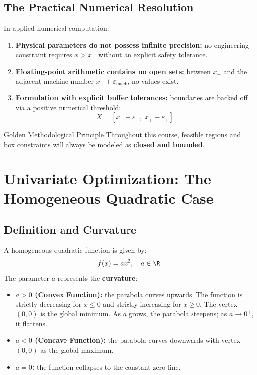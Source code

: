 \subsection{The Practical Numerical Resolution}
In applied numerical computation:
\begin{enumerate}
    \item \textbf{Physical parameters do not possess infinite precision:} no engineering constraint requires $x > x_-$ without an explicit safety tolerance.
    \item \textbf{Floating-point arithmetic contains no open sets:} between $x_-$ and the adjacent machine number $x_- + \varepsilon_{\text{mach}}$, no values exist.
    \item \textbf{Formulation with explicit buffer tolerances:} boundaries are backed off via a positive numerical threshold:
    \begin{equation}
    X = [x_- + \varepsilon_-, \; x_+ - \varepsilon_+]
    \end{equation}
\end{enumerate}

\begin{noteblock}{Golden Methodological Principle}
Throughout this course, feasible regions and box constraints will always be modeled as \textbf{closed and bounded}.
\end{noteblock}


\FloatBarrier
\section{Univariate Optimization: The Homogeneous Quadratic Case}
\label{sec:opt-homogeneous-quadratic}

\subsection{Definition and Curvature}
A homogeneous quadratic function is given by:
\begin{equation}
f(x) = ax^2, \quad a \in \R
\end{equation}
The parameter $a$ represents the \textbf{curvature}:
\begin{itemize}
    \item \textbf{$a > 0$ (Convex Function):} the parabola curves upwards. The function is strictly decreasing for $x \le 0$ and strictly increasing for $x \ge 0$. The vertex $(0, 0)$ is the global minimum. As $a$ grows, the parabola steepens; as $a \to 0^+$, it flattens.
    \item \textbf{$a < 0$ (Concave Function):} the parabola curves downwards with vertex $(0, 0)$ as the global maximum.
    \item \textbf{$a = 0$:} the function collapses to the constant zero line.
\end{itemize}

